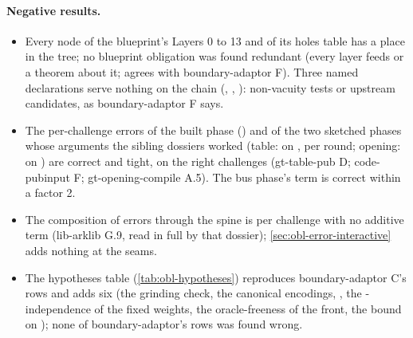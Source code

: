 \paragraph{Negative results.}
\begin{itemize}
\item Every node of the blueprint's Layers 0 to 13 and of its holes table has a place in the tree; no blueprint obligation was found redundant (every layer feeds  or a theorem about it; agrees with boundary-adaptor F). Three named declarations serve nothing on the chain (, , ): non-vacuity tests or upstream candidates, as boundary-adaptor F says.
\item The per-challenge errors of the built phase () and of the two sketched phases whose arguments the sibling dossiers worked (table:  on ,  per round; opening:  on ) are correct and tight, on the right challenges (gt-table-pub D; code-pubinput F; gt-opening-compile A.5). The bus phase's  term is correct within a factor 2.
\item The composition of errors through the spine is per challenge with no additive term (lib-arklib G.9,  read in full by that dossier); \cref{sec:obl-error-interactive} adds nothing at the seams.
\item The hypotheses table (\cref{tab:obl-hypotheses}) reproduces boundary-adaptor C's rows and adds six (the grinding check, the canonical encodings, , the -independence of the fixed weights, the oracle-freeness of the front, the bound on ); none of boundary-adaptor's rows was found wrong.
\end{itemize}
